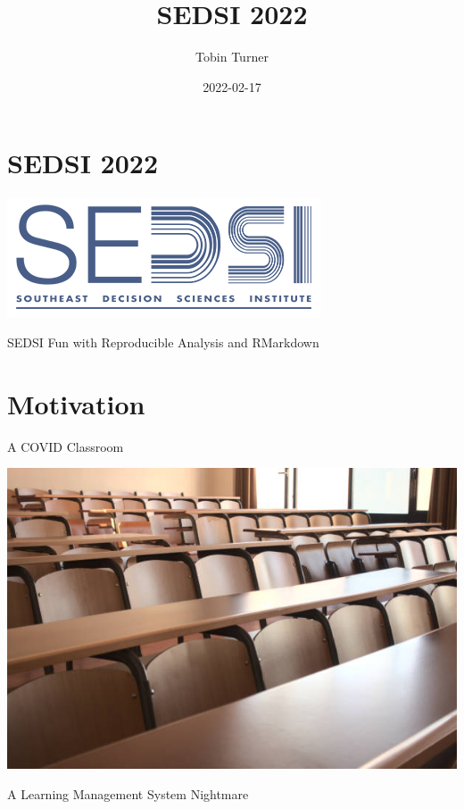 \documentclass[
]{book}
\title{SEDSI 2022}
\author{Tobin Turner}
\date{2022-02-17}
\begin{document}
\maketitle

{
\setcounter{tocdepth}{1}
\tableofcontents
}
\hypertarget{sedsi-2022}{%
\chapter{SEDSI 2022}\label{sedsi-2022}}

\begin{center}\includegraphics{_images/SEDSI} \end{center}

SEDSI Fun with Reproducible Analysis and RMarkdown

\hypertarget{motivation}{%
\chapter{Motivation}\label{motivation}}

A COVID Classroom

\begin{center}\includegraphics{_images/empty_class} \end{center}

A Learning Management System Nightmare
\end{document}
